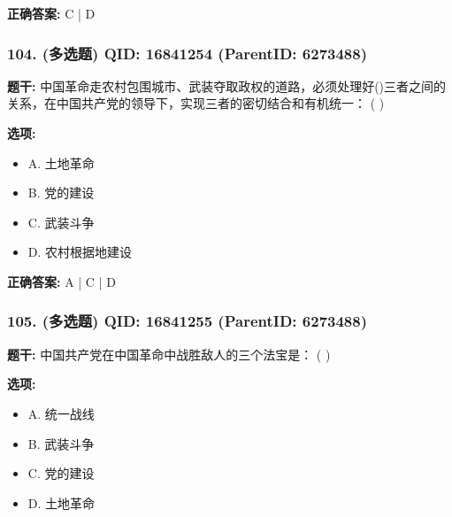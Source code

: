\documentclass[12pt,UTF8]{ctexart}
\begin{document}
\textbf{正确答案:}
C | D

\vspace{0.3em}\hrulefill\vspace{0.7em}

\subsubsection*{104. (多选题) \small QID: 16841254 (ParentID: 6273488)}

\textbf{题干:}
中国革命走农村包围城市、武装夺取政权的道路，必须处理好()三者之间的关系，在中国共产党的领导下，实现三者的密切结合和有机统一： ( )



\textbf{选项:}
\begin{itemize}[leftmargin=*]

  \item A. 土地革命

  \item B. 党的建设

  \item C. 武装斗争

  \item D. 农村根据地建设

\end{itemize}

\textbf{正确答案:}
A | C | D

\vspace{0.3em}\hrulefill\vspace{0.7em}

\subsubsection*{105. (多选题) \small QID: 16841255 (ParentID: 6273488)}

\textbf{题干:}
中国共产党在中国革命中战胜敌人的三个法宝是： ( )



\textbf{选项:}
\begin{itemize}[leftmargin=*]

  \item A. 统一战线

  \item B. 武装斗争

  \item C. 党的建设

  \item D. 土地革命

\end{itemize}
\end{document}
